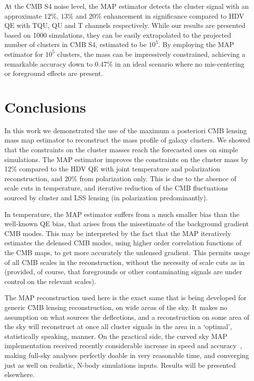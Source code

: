 \documentclass[prd, superscriptaddress, tightenlines, longbibliography, nofootinbib, eqsecnum, amsfonts, amsmath, floatfix, twocolumn, notitlepage]{revtex4-2}
\begin{document}
At the CMB S4 noise level, the MAP estimator detects the cluster signal with an approximate $12\%$, $13\%$ and $20\%$ enhancement in significance compared to HDV QE with TQU, QU and T channels respectively.
While our results are presented based on 1000 simulations, they can be easily extrapolated to the projected number of clusters in CMB S4, estimated to be $10^5$. By employing the MAP estimator for $10^5$ clusters, the mass can be impressively constrained, achieving a remarkable accuracy down to 0.47\% in an ideal scenario where no mis-centering or foreground effects are present.

\section{Conclusions}
\label{sec:conclusion}

In this work we demonstrated the use of the maximum a posteriori CMB lensing mass map estimator to reconstruct the mass profile of galaxy clusters.
We showed that the constraints on the cluster masses reach the forecasted ones on simple simulations.
The MAP estimator improves the constraints on the cluster mass by 12\% compared to the HDV QE \cite{Hu:2007bt} with joint temperature and polarization reconstruction, and 20\% from polarization only. This is due to the absence of scale cuts in temperature, and iterative reduction of the CMB fluctuations sourced by cluster and LSS lensing (in polarization predominantly).


In temperature, the MAP estimator suffers from a much smaller bias than the well-known QE bias, that arises from the misestimate of the background gradient CMB modes. This may be interpreted by the fact that the MAP iteratively estimates the delensed CMB modes, using higher order correlation functions of the CMB maps, to get more accurately the unlensed gradient.
This permits usage of all CMB scales in the reconstruction, without the necessity of scale cuts as in \cite{Hu:2007bt} (provided, of course, that foregrounds or other contaminating signals are under control on the relevant scales).

The MAP reconstruction used here is the exact same that is being developed for generic CMB lensing reconstruction, on wide areas of the sky.  It makes no assumption on what sources the deflections, and a reconstruction on some area of the sky will reconstruct at once all cluster signals in the area in a `optimal',  statistically speaking, manner.
On the practical side, the curved sky MAP implementation received recently considerable increase in speed and accuracy~\cite{Reinecke:2023gtp}, making full-sky analyses perfectly doable in very reasonable time, and converging just as well on realistic, N-body simulations inputs. Results will be presented elsewhere.
\end{document}
